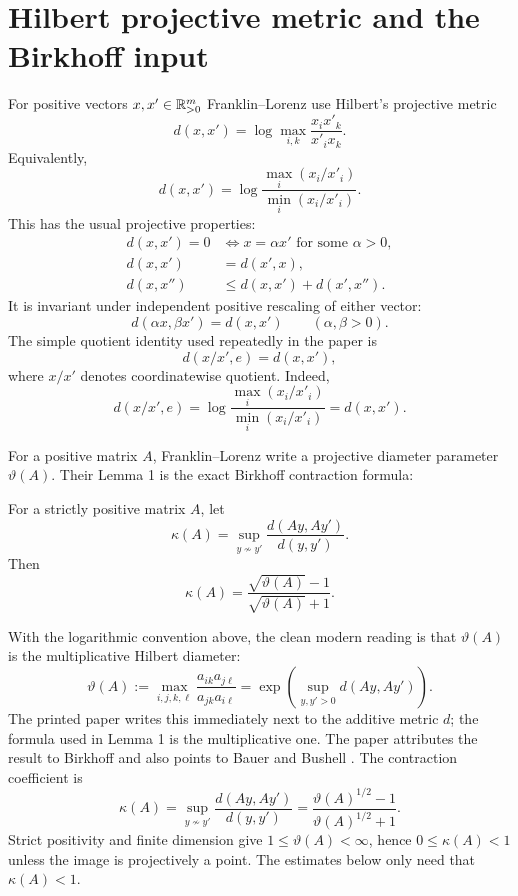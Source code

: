 \section*{Hilbert projective metric and the Birkhoff input}
For positive vectors $x,x'\in\mathbb{R}^m_{>0}$ Franklin--Lorenz use Hilbert's projective
metric
\[
  d(x,x')=
  \log \max_{i,k}\frac{x_i x'_k}{x'_i x_k}.
\]
Equivalently,
\[
  d(x,x')=
  \log\frac{\max_i(x_i/x'_i)}{\min_i(x_i/x'_i)}.
\]
This has the usual projective properties:
\begin{align*}
  d(x,x')=0 &\iff x=\alpha x'\text{ for some }\alpha>0,\\
  d(x,x') &= d(x',x),\\
  d(x,x'') &\le d(x,x')+d(x',x'').
\end{align*}
It is invariant under independent positive rescaling of either vector:
\[
  d(\alpha x,\beta x')=d(x,x')\qquad(\alpha,\beta>0).
\]
The simple quotient identity used repeatedly in the paper is
\[
  d(x/x',e)=d(x,x'),
\]
where $x/x'$ denotes coordinatewise quotient.  Indeed,
\[
  d(x/x',e)=\log\frac{\max_i(x_i/x'_i)}{\min_i(x_i/x'_i)}=d(x,x').
\]

For a positive matrix $A$, Franklin--Lorenz write a projective diameter parameter
$\vartheta(A)$.  Their Lemma 1 is the exact Birkhoff contraction formula:
\begin{lemma}
For a strictly positive matrix $A$, let
\[
  \kappa(A)=
  \sup_{y\not\sim y'}\frac{d(Ay,Ay')}{d(y,y')}.
\]
Then
\[
  \kappa(A)=
  \frac{\sqrt{\vartheta(A)}-1}{\sqrt{\vartheta(A)}+1}.
\]
\end{lemma}

With the logarithmic convention above, the clean modern reading is
that $\vartheta(A)$ is the multiplicative Hilbert diameter:
\[
  \vartheta(A)
  := \max_{i,j,k,\ell}\frac{a_{ik}a_{j\ell}}{a_{jk}a_{i\ell}}
  = \exp\left(\sup_{y,y'>0} d(Ay,Ay')\right).
\]
The printed paper writes this immediately next to the additive metric $d$; the
formula used in Lemma 1 is the multiplicative one.  The paper attributes the result
to Birkhoff and also points to Bauer and Bushell
\cite{Birkhoff1957,Bauer1965,Bushell1973}.  The contraction coefficient is
\[
  \kappa(A)
  =\sup_{y\not\sim y'}\frac{d(Ay,Ay')}{d(y,y')}
  =\frac{\vartheta(A)^{1/2}-1}{\vartheta(A)^{1/2}+1}.
\]
Strict positivity and finite dimension give $1\le \vartheta(A)<\infty$, hence
$0\le \kappa(A)<1$ unless the image is projectively a point.  The estimates below
only need that $\kappa(A)<1$.

